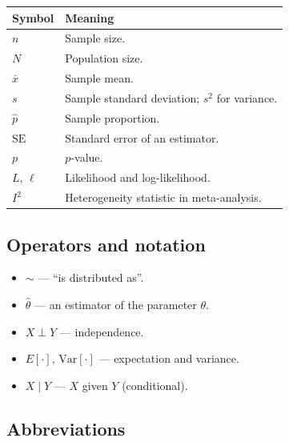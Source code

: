 \documentclass[
]{article}
\newcounter{none} %
\providecommand{\tightlist}{%
  \setlength{\itemsep}{0pt}\setlength{\parskip}{0pt}}
\begin{document}
{\def\LTcaptype{none} %
\begin{longtable}[]{@{}
  >{\raggedright\arraybackslash}p{}
  >{\raggedright\arraybackslash}p{}@{}}
\toprule\noalign{}
\begin{minipage}[b]{\linewidth}\raggedright
Symbol
\end{minipage} & \begin{minipage}[b]{\linewidth}\raggedright
Meaning
\end{minipage} \\
\midrule\noalign{}
\endhead
\bottomrule\noalign{}
\endlastfoot
\(n\) & Sample size. \\
\(N\) & Population size. \\
\(\bar{x}\) & Sample mean. \\
\(s\) & Sample standard deviation; \(s^2\) for variance. \\
\(\hat{p}\) & Sample proportion. \\
\(\mathrm{SE}\) & Standard error of an estimator. \\
\(p\) & \(p\)-value. \\
\(L\), \(\ell\) & Likelihood and log-likelihood. \\
\(I^2\) & Heterogeneity statistic in meta-analysis. \\
\end{longtable}
}

\subsection*{Operators and notation}\label{operators-and-notation}

\begin{itemize}
\tightlist
\item
  \(\sim\) --- ``is distributed as''.
\item
  \(\hat{\theta}\) --- an estimator of the parameter \(\theta\).
\item
  \(X \perp Y\) --- independence.
\item
  \(E[\cdot]\), \(\mathrm{Var}[\cdot]\) --- expectation and variance.
\item
  \(X \mid Y\) --- \(X\) given \(Y\) (conditional).
\end{itemize}

\subsection*{Abbreviations}\label{abbreviations}
\end{document}
